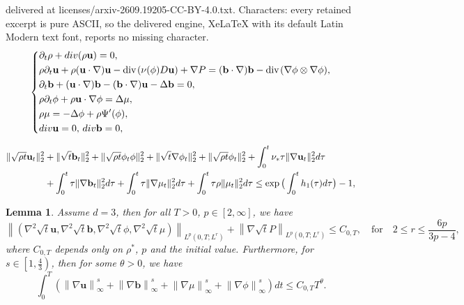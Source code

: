 \documentclass[10pt,a4paper]{amsart}
\newtheorem{lemma}[theorem]{Lemma}
\newcommand{\Dv}{{\rm div}}
\renewcommand{\div}{\mbox{\rm div}\;\!}
\begin{document}
delivered at licenses/arxiv-2609.19205-CC-BY-4.0.txt. Characters: every retained excerpt is pure ASCII, so the delivered engine, XeLaTeX with its default Latin Modern text font, reports no missing character.
\begin{align} \label{1.1}
\left\{
\begin{aligned}
&\partial_{t}\rho+\Dv (\rho \mathbf{u})=0,\\
&\rho\partial_{t}\mathbf{u}+\rho(\mathbf{u}\cdot\nabla)\mathbf{u}
-\div(\nu(\phi)D\mathbf{u})+\nabla P
=(\mathbf{b}\cdot\nabla)\mathbf{b}-\div(\nabla\phi\otimes\nabla\phi),\\
&\partial_{t}\mathbf{b}+(\mathbf{u}\cdot\nabla)\mathbf{b}-(\mathbf{b}\cdot\nabla)\mathbf{u}
-\Delta \mathbf{b}=0, \\
&\rho\partial_{t}\phi+\rho\mathbf{u}\cdot\nabla\phi=\Delta\mu,\\
&\rho\mu=-\Delta\phi+\rho\Psi'(\phi),\\
&\Dv \mathbf{u}=0,\, \Dv \mathbf{b}=0,
\end{aligned}
\right.
\end{align}

\begin{align}\label{3D}
\|\sqrt{\rho t}\mathbf{u}_t\|_2^2&+\|\sqrt{t}\mathbf{b}_t\|_2^2+\|\sqrt{\rho t}\phi_t\phi\|_2^2+\|\sqrt{ t}\nabla\phi_t\|_2^2+\|\sqrt{\rho t}\phi_t\|_2^2
+\int_{0}^{t}\nu_*\tau\|\nabla \mathbf{u}_t\|_2^2d\tau\\ \notag
&+\int_{0}^{t}\tau\|\nabla \mathbf{b}_t\|_2^2d\tau+\int_{0}^{t}\tau\|\nabla\mu_t\|_2^2d\tau
+\int_{0}^{t}\tau\rho\|\mu_t\|_2^2d\tau
\leq\exp\big(\int_{0}^{t}h_1(\tau)d\tau\big)-1,
\end{align}

\begin{lemma}\label{3DDD}
Assume \( d = 3 \), then for all \( T > 0 \), \( p \in [2,\infty] \), we have
\begin{equation}\label{3DD}
\left\lVert (\nabla^2 \sqrt{t} \mathbf{u}, \nabla^2 \sqrt{t} \mathbf{b}, \nabla^2 \sqrt{t}\phi, \nabla^2 \sqrt{t} \mu) \right\rVert_{L^p(0,T;L^r)} + \left\lVert \nabla \sqrt{t} P \right\rVert_{L^p(0,T;L^r)} \leq C_{0,T}, \quad \text{for} \quad 2 \leq r \leq \frac{6p}{3p - 4},
\end{equation}
where \( C_{0,T} \) depends only on \( \rho^* \), \( p \) and the initial value. Furthermore, for \( s \in \left[1,\frac{4}{3}\right) \), then for some \( \theta > 0 \), we have
\begin{equation}
\int_0^T \left( \left\lVert \nabla \mathbf{u} \right\rVert_\infty^s +\left\lVert \nabla \mathbf{b} \right\rVert_\infty^s + \left\lVert \nabla \mu\right\rVert_\infty^s + \left\lVert \nabla\phi \right\rVert_\infty^s \right) dt \leq C_{0,T} T^\theta.\label{eq-s}
\end{equation}
\end{lemma}
\end{document}
